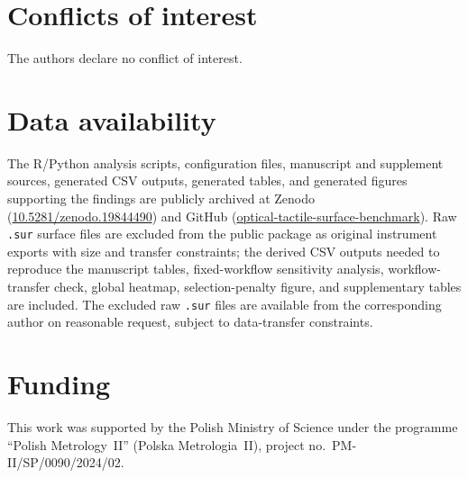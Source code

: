 \documentclass{article}
\begin{document}
\section*{Conflicts of interest}
The authors declare no conflict of interest.

\section*{Data availability}
The R/Python analysis scripts, configuration files, manuscript and supplement sources, generated CSV outputs, generated tables, and generated figures supporting the findings are publicly archived at Zenodo (\href{https://doi.org/10.5281/zenodo.19844490}{10.5281/zenodo.19844490}) and GitHub (\href{https://github.com/dawidkucharski/optical-tactile-surface-benchmark}{optical-tactile-surface-benchmark}). Raw \texttt{.sur} surface files are excluded from the public package as original instrument exports with size and transfer constraints; the derived CSV outputs needed to reproduce the manuscript tables, fixed-workflow sensitivity analysis, workflow-transfer check, global heatmap, selection-penalty figure, and supplementary tables are included. The excluded raw \texttt{.sur} files are available from the corresponding author on reasonable request, subject to data-transfer constraints.

\section*{Funding}
This work was supported by the Polish Ministry of Science under the programme ``Polish Metrology~II'' (Polska Metrologia~II), project no.~PM-II/SP/0090/2024/02.

%


\end{document}
